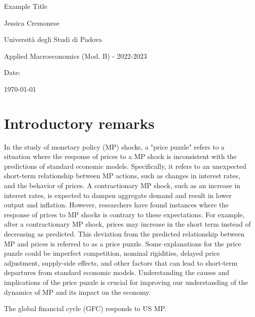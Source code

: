 \documentclass[10pt,a4paper,draft]{article}
\begin{document}
\begin{titlepage}
    \centering
    \vspace*{2cm}
    {\LARGE Example Title \par}
    \vspace{2cm}
    {\large Jessica Cremonese \par}
    \vspace{1cm}
    {\large Università degli Studi di Padova \par}
    \vspace{1cm}
    {\large Applied Macroeconomics (Mod. B) - 2022-2023 \par}
    \vspace{1cm}
    {\large Date: \par}
    {\large \today \par}
\end{titlepage}


\newpage
\section{Introductory remarks}

In the study of monetary policy (MP) shocks, a "price puzzle" refers to a situation where the response of prices to a MP shock is inconsistent with the predictions of standard economic models. Specifically, it refers to an unexpected short-term relationship between MP actions, such as changes in interest rates, and the behavior of prices. A contractionary MP shock, such as an increase in interest rates, is expected to dampen aggregate demand and result in lower output and inflation. However, researchers have found instances where the response of prices to MP shocks is contrary to these expectations. For example, after a contractionary MP shock, prices may increase in the short term instead of decreasing as predicted. This deviation from the predicted relationship between MP and prices is referred to as a price puzzle. Some explanations for the price puzzle could be imperfect competition, nominal rigidities, delayed price adjustment, supply-side effects, and other factors that can lead to short-term departures from standard economic models. Understanding the causes and implications of the price puzzle is crucial for improving our understanding of the dynamics of MP and its impact on the economy.


The global financial cycle (GFC) responds to US MP. 
\end{document}
